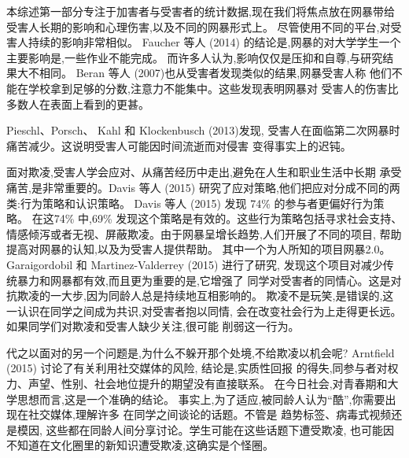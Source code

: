 \documentclass[a4paper]{article}
\begin{document}
本综述第一部分专注于加害者与受害者的统计数据,现在我们将焦点放在网暴带给
受害人长期的影响和心理伤害,以及不同的网暴形式上。
尽管使用不同的平台,对受害人持续的影响非常相似。 Faucher 等人 (2014)
\cite{faucher2014}
的结论是,网暴的对大学学生一个主要影响是,一些作业不能完成。
而许多人认为,影响仅仅是压抑和自尊,与研究结果大不相同。
Beran 等人 (2007)\cite{beran2007}也从受害者发现类似的结果,网暴受害人称
他们不能在学校拿到足够的分数,注意力不能集中。这些发现表明网暴对
受害人的伤害比多数人在表面上看到的更甚。

Pieschl、Porsch、 Kahl 和 Klockenbusch (2013)\cite{pieschl2013}发现,
受害人在面临第二次网暴时痛苦减少。这说明受害人可能因时间流逝而对侵害
变得事实上的迟钝。

面对欺凌,受害人学会应对、从痛苦经历中走出,避免在人生和职业生活中长期
承受痛苦,是非常重要的。Davis 等人 (2015)\cite{davis2015}
研究了应对策略,他们把应对分成不同的两类:行为策略和认识策略。
Davis 等人 (2015)\cite{davis2015} 发现 74\% 的参与者更偏好行为策略。
在这74\% 中,69\% 发现这个策略是有效的。这些行为策略包括寻求社会支持、
情感倾泻或者无视、屏蔽欺凌。由于网暴呈增长趋势,人们开展了不同的项目,
帮助提高对网暴的认知,以及为受害人提供帮助。
其中一个为人所知的项目网暴2.0。
Garaigordobil 和 Martinez-Valderrey (2015)\cite{gara2015} 进行了研究,
发现这个项目对减少传统暴力和网暴都有效,而且更为重要的是,它增强了
同学对受害者的同情心。这是对抗欺凌的一大步,因为同龄人总是持续地互相影响的。
欺凌不是玩笑,是错误的,这一认识在同学之间成为共识,对受害者抱以同情,
会在改变社会行为上走得更长远。如果同学们对欺凌和受害人缺少关注,很可能
削弱这一行为。

代之以面对的另一个问题是,为什么不躲开那个处境,不给欺凌以机会呢?
Arntfield (2015)\cite{arntfield2015} 讨论了有关利用社交媒体的风险,
结论是,实质性回报
的得失,同参与者对权力、声望、性别、社会地位提升的期望没有直接联系。
在今日社会,对青春期和大学思想而言,这是一个准确的结论。
事实上,为了适应,被同龄人认为``酷'',你需要出现在社交媒体,理解许多
在同学之间谈论的话题。不管是
趋势标签、病毒式视频还是模因,
这些都在同龄人间分享讨论。学生可能在这些话题下遭受欺凌,
也可能因不知道在文化圈里的新知识遭受欺凌,这确实是个怪圈。
\end{document}

